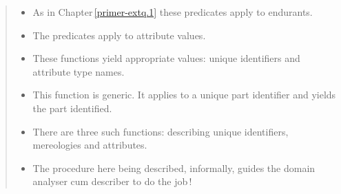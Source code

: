 \label{functions-table-2}
\begin{minipage}[h]{4.5cm}\sf\small\sf
\begin{quote}
\begin{itemize}
\item {} As in Chapter\,\ref{primer-extq.1} these
  predicates apply to endurants.
\item {} The predicates apply to
  attribute values.
\item {} These functions yield appropriate
  values: unique identifiers and attribute type names.
\item {} This function is generic. It applies
  to a unique part identifier and yields the part identified.
\item {} There are three such functions:
  describing unique identifiers, mereologies and attributes.
\item {} The procedure here being described,
  informally, guides the domain analyser cum describer to do the job\,!
\end{itemize}\normalsize
\end{quote}
\end{minipage}
\begin{minipage}[h]{5mm} \ \
\end{minipage}
\begin{minipage}[h]{7cm}\small\sf
\qbtabular\\

\qetabular\normalsize
\end{minipage}
\endboiteepaisseavecuntitre

